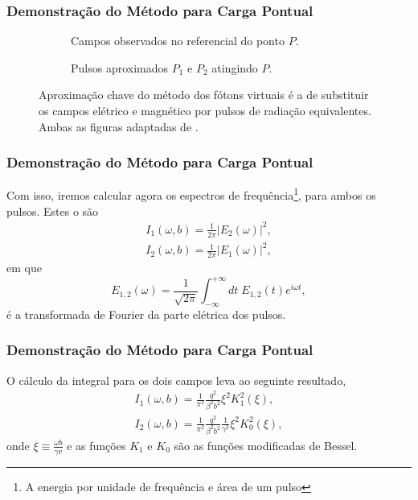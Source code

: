 \documentclass[xcolor=dvipsnames]{beamer}
\begin{document}
\begin{frame}
	\frametitle{Demonstração do Método para Carga Pontual}
	\begin{figure}
		\begin{subfigure}[b]{0.4\textwidth}
			\centering
			
			\caption{Campos observados no referencial do ponto $P$.}
		\end{subfigure}
		\hspace{1cm}
		\begin{subfigure}[b]{0.4\textwidth}
			\centering
			
			\caption{Pulsos aproximados $P_1$ e $P_2$ atingindo $P$.}
		\end{subfigure}
		\caption{Aproximação chave do método dos fótons virtuais é a de
		substituir os campos elétrico e magnético por pulsos de radiação
		equivalentes. Ambas as figuras adaptadas de \cite{caruso_quanta}.}
	\end{figure}
\end{frame}

\begin{frame}
	\frametitle{Demonstração do Método para Carga Pontual}
	Com isso, iremos calcular agora os espectros de frequência\footnote{A
	energia por unidade de frequência e área de um pulso}, para ambos os
	pulsos. Estes o são
	\begin{gather}
		I_1(\omega , b) = \frac{1}{2\pi} |E_2 (\omega) |^2 ,\\
		I_2 (\omega , b) = \frac{1}{2\pi} |E_1 (\omega)|^2,
	\end{gather}
	em que 
	\begin{equation}
		E_{1,2} (\omega) = \frac{1}{\sqrt{2\pi}} \int _{-\infty}^{+\infty}
		dt \; E _{1,2} (t) e^{i\omega t},
	\end{equation}
	é a transformada de Fourier da parte elétrica dos pulsos.
\end{frame}

\begin{frame}
	\frametitle{Demonstração do Método para Carga Pontual}
	O cálculo da integral para os dois campos leva ao seguinte resultado,
	\begin{gather}
		I_1 (\omega , b) = \frac{1}{\pi ^2} \frac{q^2}{ \beta ^2 b^2}  
		\xi ^2 K_1 ^2 \left( \xi \right), \\
		I_2 (\omega , b) = \frac{1}{\pi ^2} \frac{q^2}{\beta ^2 b^2 }
		\frac{1}{\gamma ^2} \xi^2 K_0 ^2 \left( \xi \right),
	\end{gather}
	onde $\displaystyle \xi \equiv \frac {\omega b}{\gamma v}$ e as
	funções $K_1$ e $K_0$ são as funções modificadas de Bessel.
\end{frame}
\end{document}
